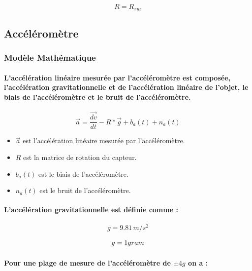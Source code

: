 \begin{equation}
	R = R_{xyz}
\end{equation}

\subsection{Accéléromètre}


\subsubsection{Modèle Mathématique}

\paragraph{L'accélération linéaire mesurée par l'accéléromètre est composée, l'accélération gravitationnelle et de l'accélération linéaire de l'objet, le biais de l'accéléromètre et le bruit de l'accéléromètre.}

\begin{equation}
	\vec{a} = \frac{\vec{dv}}{dt} - R * \vec{g} + b_a(t) + n_a(t)
\end{equation}

\begin{itemize}
	\item $\vec{a}$ est l'accélération linéaire mesurée par l'accéléromètre.
	\item $R$ est la matrice de rotation du capteur.
	\item $b_a(t)$ est le biais de l'accéléromètre.
	\item $n_a(t)$ est le bruit de l'accéléromètre.
\end{itemize}

\paragraph{L'accélération gravitationnelle est définie comme :}
\begin{equation*}
	g = 9.81 \, m/s^2
\end{equation*}

\begin{equation*}
	g = 1 gram\\
\end{equation*}

\paragraph*{Pour une plage de mesure de l'accéléromètre de $\pm 4g$ on a :}

